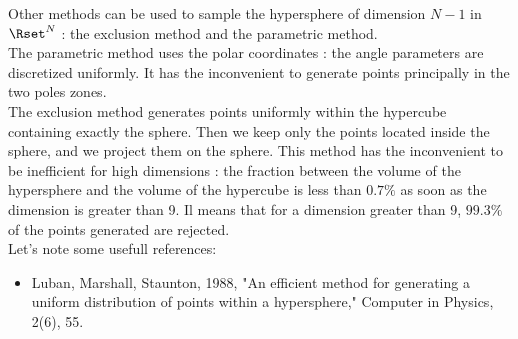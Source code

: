             {
              Other methods can be used to sample the hypersphere of dimension $N-1$ in $\Rset^N$ : the exclusion method and the parametric method.\\
              The parametric method uses the polar coordinates : the angle parameters are discretized uniformly. It has the inconvenient to generate points principally in the two poles zones.\\
              The exclusion method generates points uniformly within the hypercube containing exactly the sphere. Then we keep only the points located inside the sphere, and we project them on the sphere. This method has the inconvenient to be inefficient for high dimensions : the fraction between the  volume of the hypersphere and the volume of the hypercube  is less than $0.7 \%$ as soon as the dimension is greater than 9. Il means that for a dimension greater than 9, $99.3\%$ of the points generated are rejected. \\

              Let's note some usefull references:
              \begin{itemize}
              \item Luban, Marshall, Staunton, 1988, "An efficient method for generating a uniform distribution of points within a hypersphere," Computer in Physics, 2(6), 55.
              \end{itemize}
            }

